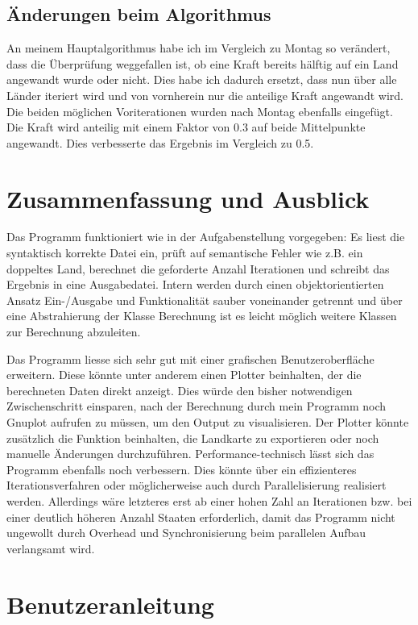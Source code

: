 \documentclass[a4paper,11pt]{article}
\begin{document}
{\subsection{\"Anderungen beim Algorithmus}
An meinem Hauptalgorithmus habe ich im Vergleich zu Montag so ver\"andert, dass die \"Uberpr\"ufung weggefallen ist, ob eine Kraft bereits h\"alftig auf ein Land angewandt wurde oder nicht.
Dies habe ich dadurch ersetzt, dass nun \"uber alle L\"ander iteriert wird und von vornherein nur die anteilige Kraft angewandt wird. Die beiden m\"oglichen Voriterationen wurden nach Montag ebenfalls eingef\"ugt.
Die Kraft wird anteilig mit einem Faktor von 0.3 auf beide Mittelpunkte angewandt. Dies verbesserte das Ergebnis im Vergleich zu 0.5.

\section{Zusammenfassung und Ausblick}
Das Programm funktioniert wie in der Aufgabenstellung vorgegeben: Es liest die syntaktisch korrekte Datei ein, pr\"uft auf semantische Fehler wie z.B. ein doppeltes Land, berechnet die geforderte Anzahl
Iterationen und schreibt das Ergebnis in eine Ausgabedatei. Intern werden durch einen objektorientierten Ansatz Ein-/Ausgabe und Funktionalit\"at sauber voneinander getrennt und \"uber eine Abstrahierung
der Klasse Berechnung ist es leicht m\"oglich weitere Klassen zur Berechnung abzuleiten.

Das Programm liesse sich sehr gut mit einer grafischen Benutzeroberfl\"ache erweitern. Diese k\"onnte unter anderem einen Plotter beinhalten, der die berechneten Daten direkt anzeigt. Dies w\"urde den bisher notwendigen Zwischenschritt einsparen,
nach der Berechnung durch mein Programm noch Gnuplot aufrufen zu m\"ussen, um den Output zu visualisieren. Der Plotter k\"onnte zus\"atzlich die Funktion beinhalten,
die Landkarte zu exportieren oder noch manuelle \"Anderungen durchzuf\"uhren. Performance-technisch l\"asst sich das Programm ebenfalls noch verbessern. Dies k\"onnte \"uber ein effizienteres Iterationsverfahren oder 
m\"oglicherweise auch durch Parallelisierung realisiert werden. Allerdings w\"are letzteres erst ab einer hohen Zahl an Iterationen bzw. bei einer deutlich h\"oheren Anzahl Staaten erforderlich, damit das Programm nicht
ungewollt durch Overhead und Synchronisierung beim parallelen Aufbau verlangsamt wird.

\section{Benutzeranleitung}
}
\end{document}

